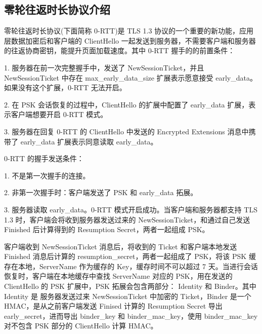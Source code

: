 \subsection{零轮往返时长协议介绍}

零轮往返时长协议(下面简称 0-RTT)是 TLS 1.3 协议的一个重要的新功能，应用层数据加密后和客户端的 ClientHello 一起发送到服务器，不需要客户端和服务器的往返协商密钥，能提升页面加载速度。其中 0-RTT 握手的的前置条件： 

1. 服务器在前一次完整握手中，发送了 NewSessionTicket，并且 NewSessionTic\-ket 中存在 max\_early\_data\_size 扩展表示愿意接受 early\_data。如果没有这个扩展，0-RTT 无法开启。

2. 在 PSK 会话恢复的过程中，ClientHello 的扩展中配置了 early\_data 扩展，表示客户端想要开启 0-RTT 模式。

3. 服务器在回复 0-RTT 的 ClientHello 中发送的 Encrypted Extensions 消息中携带了 early\_data 扩展表示同意读取 early\_data。

0-RTT 的握手发送条件： 

1. 不是第一次握手的连接。

2. 非第一次握手时：客户端发送了 PSK 和 early\_data 拓展。

3. 服务器读取 early\_data。0-RTT 模式开启成功。当客户端和服务器都支持 TLS 1.3 时，客户端会将收到服务器发送过来的 NewSessionTicket，和通过自己发送 Finished 后计算得到的 Resumption Secret，两者一起组成 PSK。


客户端收到 NewSessionTicket 消息后，将收到的 Ticket 和客户端本地发送 Finished 消息后计算的 resumption\_secret，两者一起组成了 PSK，将该 PSK 缓存在本地，ServerName 作为缓存的 Key，缓存时间不可以超过 7 天。当进行会话恢复时，客户端在本地缓存中查找 ServerName 对应的 PSK，用在发送的 ClientHello 的 PSK 扩展中，PSK 拓展会包含两部分： Identity 和 Binder。其中 Identity 是 服务器发送过来 NewSessionTicket 中加密的 Ticket，Binder 是一个 HMAC，是从之前客户端发送 Finised 计算的 Resumption Secret 导出 early\_secret，进而导出 binder\_key 和 binder\_mac\_key，使用 binder\_mac\_key 对不包含 PSK 部分的 ClientHello 计算 HMAC。

